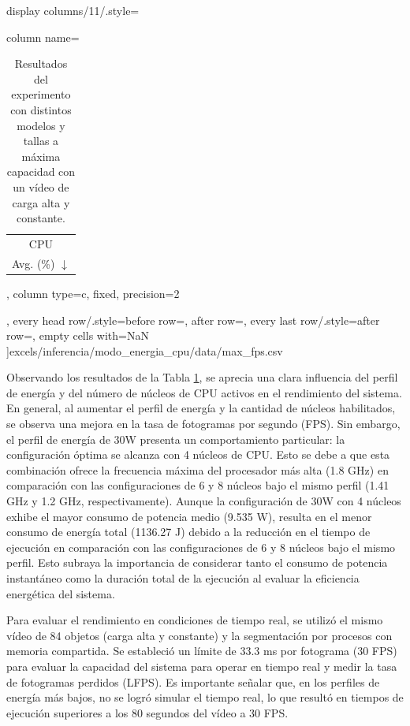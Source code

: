 \documentclass[11pt,spanish,listoffigures,listoftables]{tfgetsinf}
\begin{document}
\begin{table}[H]
{      display columns/11/.style={column name=\begin{tabular}[c]{@{}c@{}}CPU \\ Avg. (\%) $\downarrow$\end{tabular}, column type={c}, fixed, precision=2},
      every head row/.style={before row=\toprule, after row=\midrule},
      every last row/.style={after row=\bottomrule},
      empty cells with={NaN}
      ]{excels/inferencia/modo_energia_cpu/data/max_fps.csv}
      }
      \caption[Resultados del experimento con distintos modelos y tallas a máxima capacidad con un vídeo de carga alta y constante]{Resultados del experimento con distintos modelos y tallas a máxima capacidad con un vídeo de carga alta y constante.}
      \label{tab:experimento_modo_energia_cpu_max_fps_carga_alta_constante}
   \end{table}

   Observando los resultados de la Tabla \ref{tab:experimento_modo_energia_cpu_max_fps_carga_alta_constante}, se aprecia una clara influencia del perfil de energía y del número de núcleos de CPU activos en el rendimiento del sistema. En general, al aumentar el perfil de energía y la cantidad de núcleos habilitados, se observa una mejora en la tasa de fotogramas por segundo (FPS). Sin embargo, el perfil de energía de 30W presenta un comportamiento particular: la configuración óptima se alcanza con 4 núcleos de CPU. Esto se debe a que esta combinación ofrece la frecuencia máxima del procesador más alta (1.8 GHz) en comparación con las configuraciones de 6 y 8 núcleos bajo el mismo perfil (1.41 GHz y 1.2 GHz, respectivamente). Aunque la configuración de 30W con 4 núcleos exhibe el mayor consumo de potencia medio (9.535 W), resulta en el menor consumo de energía total (1136.27 J) debido a la reducción en el tiempo de ejecución en comparación con las configuraciones de 6 y 8 núcleos bajo el mismo perfil. Esto subraya la importancia de considerar tanto el consumo de potencia instantáneo como la duración total de la ejecución al evaluar la eficiencia energética del sistema.

   Para evaluar el rendimiento en condiciones de tiempo real, se utilizó el mismo vídeo de 84 objetos (carga alta y constante) y la segmentación por procesos con memoria compartida. Se estableció un límite de 33.3 ms por fotograma (30 FPS) para evaluar la capacidad del sistema para operar en tiempo real y medir la tasa de fotogramas perdidos (LFPS). Es importante señalar que, en los perfiles de energía más bajos, no se logró simular el tiempo real, lo que resultó en tiempos de ejecución superiores a los 80 segundos del vídeo a 30 FPS.
\end{document}
